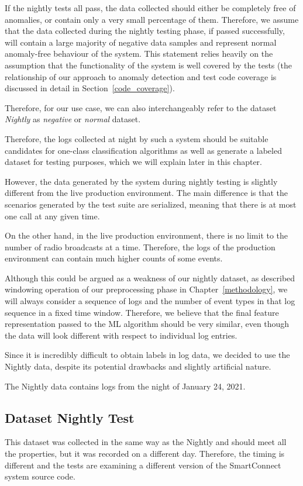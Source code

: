 If the nightly tests all pass, the data collected should either be completely free of anomalies, or contain only a very small percentage of them. 
Therefore, we assume that the data collected during the nightly testing phase, if passed successfully, will contain a large majority of negative data samples and represent normal anomaly-free behaviour of the system. This statement relies heavily on the assumption that the functionality of the system is well covered by the tests (the relationship of our approach to anomaly detection and test code coverage is discussed in detail in Section~\ref{code_coverage}). 

Therefore, for our use case, we can also interchangeably refer to the dataset \textit{Nightly} as \textit{negative} or \textit{normal} dataset.

Therefore, the logs collected at night by such a system should be suitable candidates for one-class classification algorithms as well as generate a labeled dataset for testing purposes, which we will explain later in this chapter.

However, the data generated by the system during nightly testing is slightly different from the live production environment. The main difference is that the scenarios generated by the test suite are serialized, meaning that there is at most one call at any given time. 

On the other hand, in the live production environment, there is no limit to the number of radio broadcasts at a time. Therefore, the logs of the production environment can contain much higher counts of some events.

Although this could be argued as a weakness of our nightly dataset, as described windowing operation of our preprocessing phase in Chapter~\ref{methodology}, we will always consider a sequence of logs and the number of event types in that log sequence in a fixed time window. Therefore, we believe that the final feature representation passed to the ML algorithm should be very similar, even though the data will look different with respect to individual log entries.

Since it is incredibly difficult to obtain labels in log data, we decided to use the Nightly data, despite its potential drawbacks and slightly artificial nature.

The Nightly data contains logs from the night of January 24, 2021.

\subsection{Dataset Nightly Test}
This dataset was collected in the same way as the Nightly and should meet all the properties, but it was recorded on a different day. Therefore, the timing is different and the tests are examining a different version of the SmartConnect system source code.

